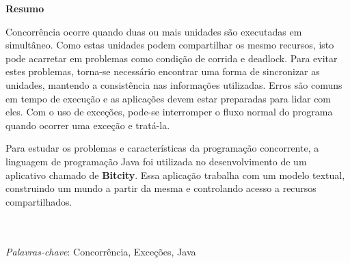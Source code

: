 {
\Large
\begin{center}
\textbf{Resumo}
\end{center}
}

Concorrência ocorre quando duas ou mais unidades são executadas em
simultâneo. Como estas unidades podem compartilhar os mesmo recursos, isto
pode acarretar em problemas como condição de corrida e deadlock.
Para evitar estes problemas, torna-se necessário encontrar uma forma
de sincronizar as unidades, mantendo a consistência nas
informações utilizadas. Erros são comuns em tempo de execução e as
aplicações devem estar preparadas para lidar com eles.  Com o uso de
exceções, pode-se interromper o fluxo normal do programa quando ocorrer
uma exceção e tratá-la.

Para estudar os problemas e características da programação concorrente,
a linguagem de programação Java foi utilizada no desenvolvimento de um
aplicativo chamado de \textbf{Bitcity}. Essa aplicação trabalha com um
modelo textual, construindo um mundo a partir da mesma e controlando
acesso a recursos compartilhados.

\quad\\
\quad\\
\textit{Palavras-chave}: Concorrência, Exceções, Java

\pagebreak
